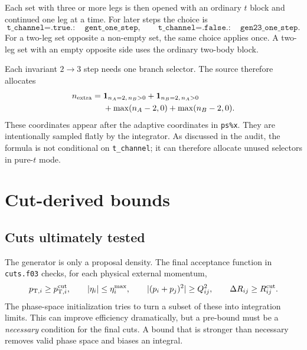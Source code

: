 \documentclass[11pt,a4paper]{article}
\newcommand{\code}[1]{\texttt{#1}}
\begin{document}
Each set with three or more legs is then opened with an ordinary $t$ block and
continued one leg at a time.  For later steps the choice is
\begin{equation}
 \code{t\_channel=.true.}:\quad\code{gent\_one\_step},
 \qquad
 \code{t\_channel=.false.}:\quad\code{gen23\_one\_step}.
 \label{eq:channelchoice}
\end{equation}
For a two-leg set opposite a non-empty set, the same choice applies once.  A
two-leg set with an empty opposite side uses the ordinary two-body block.

Each invariant $2\to3$ step needs one branch selector.  The source therefore
allocates
\begin{align}
 n_{\rm extra}={}&\boldsymbol1_{n_A=2,\,n_B>0}
 +\boldsymbol1_{n_B=2,\,n_A>0}\notag\\
 &{}+\max(n_A-2,0)+\max(n_B-2,0).
 \label{eq:extra}
\end{align}
These coordinates appear after the adaptive coordinates in \code{ps\%x}.
They are intentionally sampled flatly by the integrator.  As discussed in the
audit, the formula is not conditional on \code{t\_channel}; it can therefore
allocate unused selectors in pure-$t$ mode.

\section{Cut-derived bounds}

\subsection{Cuts ultimately tested}

The generator is only a proposal density.  The final acceptance function in
\code{cuts.f03} checks, for each physical external momentum,
\begin{equation}
 p_{\mathrm{T},i}\geq p_{\mathrm{T},i}^{\rm cut},\qquad |\eta_i|\leq\eta_i^{\rm max},
 \qquad |(p_i+p_j)^2|\geq Q_{ij}^2,
 \qquad \Delta R_{ij}\geq R_{ij}^{\rm cut}.
 \label{eq:finalcuts}
\end{equation}
The phase-space initialization tries to turn a subset of these into integration
limits.  This can improve efficiency dramatically, but a pre-bound must be a
\emph{necessary} condition for the final cuts.  A bound that is stronger than
necessary removes valid phase space and biases an integral.
\end{document}
